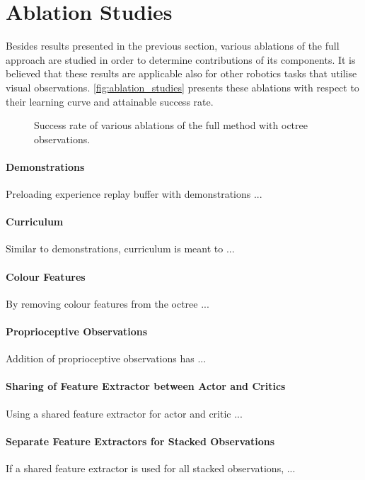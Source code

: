 \section{Ablation Studies}

Besides results presented in the previous section, various ablations of the full approach are studied in order to determine contributions of its components. It is believed that these results are applicable also for other robotics tasks that utilise visual observations. \autoref{fig:ablation_studies} presents these ablations with respect to their learning curve and attainable success rate.

\begin{figure}[ht]
    \centering
    \caption{Success rate of various ablations of the full method with octree observations.}
    \label{fig:ablation_studies}
\end{figure}

\paragraph{Demonstrations} Preloading experience replay buffer with demonstrations ...

\paragraph{Curriculum} Similar to demonstrations, curriculum is meant to ...

\paragraph{Colour Features} By removing colour features from the octree ...

\paragraph{Proprioceptive Observations} Addition of proprioceptive observations has ...

\paragraph{Sharing of Feature Extractor between Actor and Critics} Using a shared feature extractor for actor and critic ...

\paragraph{Separate Feature Extractors for Stacked Observations} If a shared feature extractor is used for all stacked observations, ...
